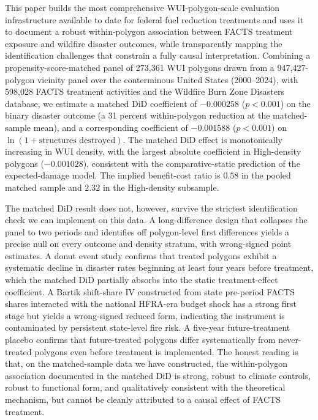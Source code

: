 \documentclass[12pt, letterpaper]{article}
\begin{document}
This paper builds the most comprehensive WUI-polygon-scale evaluation infrastructure available to date for federal fuel reduction treatments and uses it to document a robust within-polygon association between FACTS treatment exposure and wildfire disaster outcomes, while transparently mapping the identification challenges that constrain a fully causal interpretation. Combining a propensity-score-matched panel of 273{,}361 WUI polygons drawn from a 947{,}427-polygon vicinity panel over the conterminous United States (2000--2024), with 598{,}028 FACTS treatment activities and the Wildfire Burn Zone Disasters database, we estimate a matched DiD coefficient of $-0.000258$ ($p < 0.001$) on the binary disaster outcome (a 31 percent within-polygon reduction at the matched-sample mean), and a corresponding coefficient of $-0.001588$ ($p < 0.001$) on $\ln(1 + \text{structures destroyed})$. The matched DiD effect is monotonically increasing in WUI density, with the largest absolute coefficient in High-density polygons ($-0.001028$), consistent with the comparative-static prediction of the expected-damage model. The implied benefit-cost ratio is $0.58$ in the pooled matched sample and $2.32$ in the High-density subsample.

The matched DiD result does not, however, survive the strictest identification check we can implement on this data. A long-difference design that collapses the panel to two periods and identifies off polygon-level first differences yields a precise null on every outcome and density stratum, with wrong-signed point estimates. A donut event study confirms that treated polygons exhibit a systematic decline in disaster rates beginning at least four years before treatment, which the matched DiD partially absorbs into the static treatment-effect coefficient. A Bartik shift-share IV constructed from state pre-period FACTS shares interacted with the national HFRA-era budget shock has a strong first stage but yields a wrong-signed reduced form, indicating the instrument is contaminated by persistent state-level fire risk. A five-year future-treatment placebo confirms that future-treated polygons differ systematically from never-treated polygons even before treatment is implemented. The honest reading is that, on the matched-sample data we have constructed, the within-polygon association documented in the matched DiD is strong, robust to climate controls, robust to functional form, and qualitatively consistent with the theoretical mechanism, but cannot be cleanly attributed to a causal effect of FACTS treatment.
\end{document}
